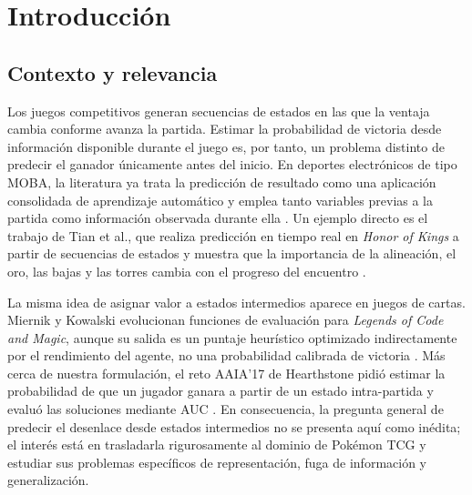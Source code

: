 \section{Introducción}
\label{sec:introduccion}

\subsection{Contexto y relevancia}
\label{subsec:contexto}
Los juegos competitivos generan secuencias de estados en las que la
ventaja cambia conforme avanza la partida. Estimar la probabilidad de
victoria desde información disponible durante el juego es, por tanto,
un problema distinto de predecir el ganador únicamente antes del
inicio. En deportes electrónicos de tipo MOBA, la literatura ya trata
la predicción de resultado como una aplicación consolidada de
aprendizaje automático y emplea tanto variables previas a la partida
como información observada durante ella \cite{kamal_moba_2025}. Un
ejemplo directo es el trabajo de Tian et al., que realiza predicción en
tiempo real en \emph{Honor of Kings} a partir de secuencias de estados
y muestra que la importancia de la alineación, el oro, las bajas y las
torres cambia con el progreso del encuentro \cite{tian_hero_2022}.

La misma idea de asignar valor a estados intermedios aparece en juegos
de cartas. Miernik y Kowalski evolucionan funciones de evaluación para
\emph{Legends of Code and Magic}, aunque su salida es un puntaje
heurístico optimizado indirectamente por el rendimiento del agente, no
una probabilidad calibrada de victoria \cite{miernik_evolving_2022}. Más
cerca de nuestra formulación, el reto AAIA'17 de Hearthstone pidió
estimar la probabilidad de que un jugador ganara a partir de un estado
intra-partida y evaluó las soluciones mediante AUC
\cite{janusz_hearthstone_2017}. En consecuencia, la pregunta general de
predecir el desenlace desde estados intermedios no se presenta aquí
como inédita; el interés está en trasladarla rigurosamente al dominio
de Pokémon TCG y estudiar sus problemas específicos de representación,
fuga de información y generalización.

